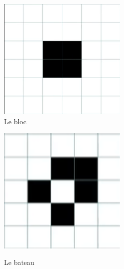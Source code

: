 \documentclass[12,french]{report}
\begin{document}
\begin{figure}[H]
    \begin{minipage}[c]{.46\linewidth}
        \centering
        \includegraphics[width=0.55\textwidth]{./Images/6}\\
        \caption{Le bloc}
    \end{minipage}
    \hfill%
    \begin{minipage}[c]{.46\linewidth}
        \centering
        \includegraphics[width=0.55\textwidth]{./Images/7}\\
        \caption{Le bateau}
    \end{minipage}
\end{figure}%
\end{document}
